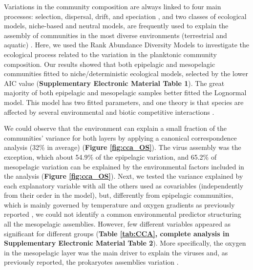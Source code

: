 \documentclass[fleqn,10pt]{wlscirep}
\begin{document}
Variations in the community composition are always linked to four main processes: selection, dispersal, drift, and speciation \cite{vellend_conceptual_2010}, and two classes of ecological models, niche-based and neutral models, are frequently used to explain the assembly of communities in the most diverse environments (terrestrial and aquatic) \cite{chave_neutral_2004, mcgill_empirical_2006}. Here, we used the Rank Abundance Diversity Models to investigate the ecological process related to the variation in the planktonic community composition. Our results showed that both epipelagic and mesopelagic communities fitted to niche/deterministic ecological models, selected by the lower AIC value (\textbf{Supplementary Electronic Material Table 1}). The great majority of both epipelagic and mesopelagic samples better fitted the Lognormal model. This model has two fitted parameters, and one theory is that species are affected by several environmental and biotic competitive interactions \cite{wilson_methods_1991}. 

We could observe that the environment can explain a small fraction of the communities’ variance for both layers by applying a canonical correspondence analysis (32\% in average) (\textbf{Figure \ref{fig:cca_OS}}). The virus assembly was the exception, which about 54.9\% of the epipelagic variation, and 65.2\% of mesopelagic variation can be explained by the environmental factors included in the analysis (\textbf{Figure \ref{fig:cca_OS}}). Next, we tested the variance explained by each explanatory variable with all the others used as covariables (independently from their order in the model), but, differently from epipelagic communities, which is mainly governed by temperature and oxygen gradients as previously reported \cite{sunagawa_structure_2015,gregory_marine_2019,ibarbalz_global_2019,giner_marked_2020, ghiglione_pole--pole_2012}, we could not identify a common environmental predictor structuring all the mesopelagic assemblies. However, few different variables appeared as significant for different groups (\textbf{Table \ref{tab:CCA}, complete analysis in Supplementary Electronic Material Table 2}). More specifically, the oxygen in the mesopelagic layer was the main driver to explain the viruses and, as previously reported, the prokaryotes assemblies variation \cite{wright_microbial_2012, ulloa_pelagic_2013, aldunate_oxygen_2018}. 
\end{document}
